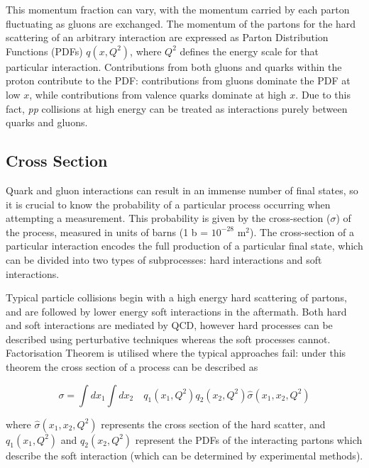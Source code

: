\documentclass[12pt,a4paper,epsf,portrait,times,epsfig]{report}
\begin{document}
	This momentum fraction can vary, with the momentum carried by each parton fluctuating as gluons are exchanged. The momentum of the partons for the hard scattering of an arbitrary interaction are expressed as Parton Distribution Functions (PDFs) $q(x, Q^{2})$, where $Q^{2}$ defines the energy scale for that particular interaction. Contributions from both gluons and quarks within the proton contribute to the PDF: contributions from gluons dominate the PDF at low $x$, while contributions from valence quarks dominate at high $x$. Due to this fact, \textit{pp} collisions at high energy can be treated as interactions purely between quarks and gluons. \par

	\subsection{Cross Section}

	Quark and gluon interactions can result in an immense number of final states, so it is crucial to know the probability of a particular process occurring when attempting a measurement. This probability is given by the cross-section ($\sigma$) of the process, measured in units of barns (1 b = $10^{-28}$ m$^{2}$). The cross-section of a particular interaction encodes the full production of a particular final state, which can be divided into two types of subprocesses: hard interactions and soft interactions. \par
	
	Typical particle collisions begin with a high energy hard scattering of partons, and are followed by lower energy soft interactions in the aftermath. Both hard and soft interactions are mediated by QCD, however hard processes can be described using perturbative techniques whereas the soft processes cannot. Factorisation Theorem \cite{HardProcessFactorization} is utilised where the typical approaches fail: under this theorem the cross section of a process can be described as
	
	\begin{equation}
		\sigma = \int dx_{1} \int dx_{2} \quad q_{1}(x_{1}, Q^{2})q_{2}(x_{2},Q^{2})\hat{\sigma}(x_{1},x_{2},Q^{2})
	\end{equation}

	where $\hat{\sigma}(x_{1},x_{2},Q^{2})$ represents the cross section of the hard scatter, and $q_{1}(x_{1},Q^{2})$ and $q_{2}(x_{2},Q^{2})$ represent the PDFs of the interacting partons which describe the soft interaction (which can be determined by experimental methods). \par
\end{document}
